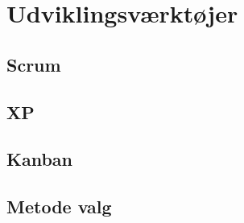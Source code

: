 
\chapter{Udviklingsværktøjer}\label{ch:udviklingsværktøjer}

\section{Scrum}




\section{XP}



\section{Kanban}


\section{Metode valg}


 


